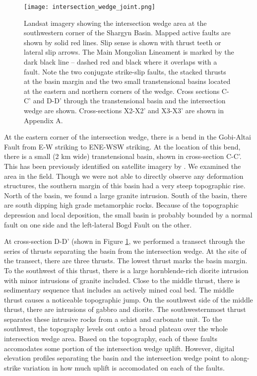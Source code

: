 \begin{figure}[ht!]
  \centering
  \texttt{[image: intersection\_wedge\_joint.png]}
  \caption{Landsat imagery showing the intersection wedge area at the southwestern corner of the Shargyn Basin. Mapped active faults are shown by solid red lines. Slip sense is shown with thrust teeth or lateral slip arrows. The Main Mongolian Lineament is marked by the dark black line -- dashed red and black where it overlaps with a fault. Note the two conjugate strike-slip faults, the stacked thrusts at the basin margin and the two small transtensional basins located at the eastern and northern corners of the wedge. Cross sections C-C' and D-D' through the transtensional basin and the intersection wedge are shown. Cross-sections X2-X2' and X3-X3' are shown in Appendix A.}
  \label{intersection_wedge_joint}
\end{figure}

At the eastern corner of the intersection wedge, there is a bend in the Gobi-Altai Fault from E-W striking to ENE-WSW striking. At the location of this bend, there is a small (2 km wide) transtensional basin, shown in cross-section C-C'. This has been previously identified on satellite imagery by \citet{Cunningham2010}. We examined the area in the field. Though we were not able to directly observe any deformation structures, the southern margin of this basin had a very steep topographic rise. North of the basin, we found a large granite intrusion. South of the basin, there are south dipping high grade metamorphic rocks. Because of the topographic depression and local deposition, the small basin is probably bounded by a normal fault on one side and the left-lateral Bogd Fault on the other. 

At cross-section D-D' (shown in Figure \ref{intersection_wedge_joint}, we performed a transect through the series of thrusts separating the basin from the intersection wedge. At the site of the transect, there are three thrusts. The lowest thrust marks the basin margin. To the southwest of this thrust, there is a large hornblende-rich diorite intrusion with minor intrusions of granite included. Close to the middle thrust, there is sedimentary sequence that includes an actively mined coal bed. The middle thrust causes a noticeable topographic jump. On the southwest side of the middle thrust, there are intrusions of gabbro and diorite. The southwesternmost thrust separates these intrusive rocks from a schist and carbonate unit. To the southwest, the topography levels out onto a broad plateau over the whole intersection wedge area. Based on the topography, each of these faults accomodates some portion of the intersection wedge uplift. However, digital elevation profiles separating the basin and the intersection wedge point to along-strike variation in how much uplift is accomodated on each of the faults. 

